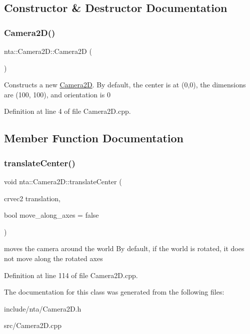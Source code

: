 \subsection{Constructor \& Destructor Documentation}
\mbox{\label{classnta_1_1Camera2D_a11aada3f997c594ade11dd3c46d826f4}} 
\subsubsection{\texorpdfstring{Camera2\+D()}{Camera2D()}}
{\footnotesize\ttfamily nta\+::\+Camera2\+D\+::\+Camera2D (\begin{DoxyParamCaption}{ }\end{DoxyParamCaption})}

Constructs a new \hyperlink{classnta_1_1Camera2D}{Camera2D}. By default, the center is at (0,0), the dimensions are (100, 100), and orientation is 0 

Definition at line 4 of file Camera2\+D.\+cpp.



\subsection{Member Function Documentation}
\mbox{\label{classnta_1_1Camera2D_a711b1b64b4e0bbca5c598ac15609f498}} 
\subsubsection{\texorpdfstring{translate\+Center()}{translateCenter()}}
{\footnotesize\ttfamily void nta\+::\+Camera2\+D\+::translate\+Center (\begin{DoxyParamCaption}\item[{crvec2}]{translation,  }\item[{bool}]{move\+\_\+along\+\_\+axes = {\ttfamily false} }\end{DoxyParamCaption})}

moves the camera around the world By default, if the world is rotated, it does not move along the rotated axes 

Definition at line 114 of file Camera2\+D.\+cpp.



The documentation for this class was generated from the following files\+:\begin{DoxyCompactItemize}
\item 
include/nta/Camera2\+D.\+h\item 
src/Camera2\+D.\+cpp\end{DoxyCompactItemize}
